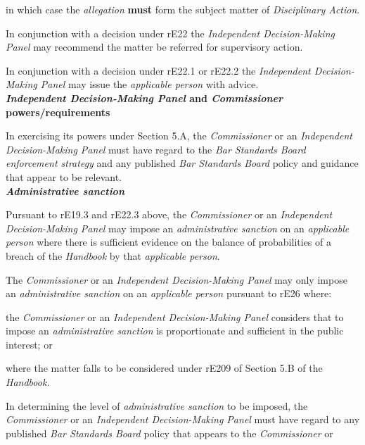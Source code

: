 in which case the \emph{allegation}  \textcolor{myred}{\textbf{must}} form the subject matter
of \emph{Disciplinary Action}.\\
\par
In conjunction with a decision under rE22 the \emph{Independent
Decision-Making Panel} may recommend the matter be referred for
supervisory action.\\
\par
In conjunction with a decision under rE22.1 or rE22.2
the \emph{Independent Decision-Making Panel }may issue
the \emph{applicable person} with advice.\\
\textbf{\emph{Independent Decision-Making
Panel} and \emph{Commissioner} powers/requirements}\par
{}\par
In exercising its powers under Section 5.A, the \emph{Commissioner} or
an \emph{Independent Decision-Making Panel }must have regard to
the \emph{Bar Standards Board enforcement strategy} and any
published \emph{Bar Standards Board} policy and guidance that appear to
be relevant.\\
\textbf{\emph{Administrative sanction}}\par
{}\par
Pursuant to rE19.3 and rE22.3 above, the \emph{Commissioner }or
an \emph{Independent Decision-Making Panel }may impose
an \emph{administrative sanction} on an \emph{applicable person} where
there is sufficient evidence on the balance of probabilities of a breach
of the \emph{Handbook} by that \emph{applicable person}.\\
\par
The \emph{Commissioner} or an \emph{Independent Decision-Making
Panel }may only impose an \emph{administrative sanction} on
an \emph{applicable person} pursuant to rE26 where:\\\nl \item the \emph{Commissioner }or an \emph{Independent Decision-Making
Panel }considers that to impose an \emph{administrative sanction} is
proportionate and sufficient in the public interest; or\item where the matter falls to be considered under rE209 of Section 5.B of
the \emph{Handbook.}\ln
{}\par
In determining the level of \emph{administrative sanction} to be
imposed, the \emph{Commissioner }or an \emph{Independent Decision-Making
Panel }must have regard to any published \emph{Bar Standards
Board} policy that appears to the \emph{Commissioner }or
